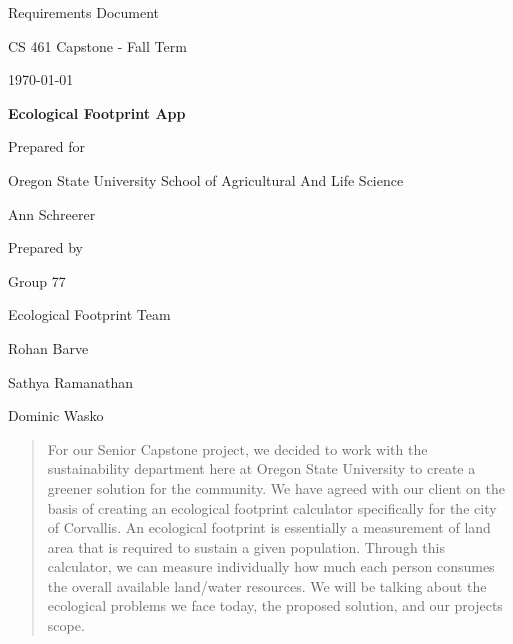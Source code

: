 \documentclass[onecolumn, draftclsnofoot,10pt, compsoc, tikz]{IEEEtran}
\def \CapstoneTeamName{		Ecological Footprint Team}
\def \CapstoneTeamNumber{		77}
\def \GroupMemberOne{			Rohan Barve}
\def \GroupMemberTwo{			Sathya Ramanathan}
\def \GroupMemberThree{			Dominic Wasko}
\def \CapstoneProjectName{		Ecological Footprint App}
\def \CapstoneSponsorCompany{	Oregon State University School of Agricultural And Life Science}
\def \CapstoneSponsorPerson{		Ann Schreerer}
\def \DocType{Requirements Document}
\newcommand{\NameSigPair}[1]{\par
\makebox[2.75in][r]{#1} \hfil 	\makebox[3.25in]{\makebox[2.25in]{\hrulefill} \hfill		\makebox[.75in]{\hrulefill}}
\par\vspace{-12pt} \textit{\tiny\noindent
\makebox[2.75in]{} \hfil		\makebox[3.25in]{\makebox[2.25in][r]{Signature} \hfill	\makebox[.75in][r]{Date}}}}
\renewcommand{\NameSigPair}[1]{#1}
\begin{document}
\begin{titlepage}
    \begin{singlespace}
        \hfill 
        \par\vspace{.2in}
        \centering
        \scshape{
	 \huge \DocType \par
            \huge CS 461 Capstone - Fall Term \par
            {\large\today}\par
            \vspace{.5in}
            \textbf{\Huge\CapstoneProjectName}\par
            \vfill
            {\large Prepared for}\par
            \Huge \CapstoneSponsorCompany\par
            \vspace{5pt}
            {\Large\NameSigPair{\CapstoneSponsorPerson}\par}
            {\large Prepared by }\par
            Group\CapstoneTeamNumber\par
            \CapstoneTeamName\par 
            \vspace{5pt}
            {\Large
                \NameSigPair{\GroupMemberOne}\par
                \NameSigPair{\GroupMemberTwo}\par
                \NameSigPair{\GroupMemberThree}\par
            }
            \vspace{20pt}
        }
        \begin{abstract}
        	For our Senior Capstone project, we decided to work with the sustainability department here at Oregon State University to create a greener solution for the community. 
	We have agreed with our client on the basis of creating an ecological footprint calculator specifically for the city of Corvallis.
	An ecological footprint is essentially a measurement of land area that is required to sustain a given population. 
	Through this calculator, we can measure individually how much each person consumes the overall available land/water resources. 
	We will be talking about the ecological problems we face today, the proposed solution, and our projects scope.
        \end{abstract}     
    \end{singlespace}
\end{titlepage}
\newpage
{}
\tableofcontents
\listoffigures
\listoftables
\clearpage
\end{document}

